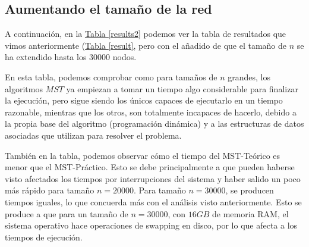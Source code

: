 \documentclass[paper=a4, fontsize=11pt]{article} %
\numberwithin{equation}{section} %
\numberwithin{figure}{section} %
\numberwithin{table}{section} %
\begin{document}
\subsection{Aumentando el tamaño de la red}

A continuación, en la \hyperref[results2]{Tabla \ref*{results2}} podemos ver la tabla de resultados que vimos anteriormente (\hyperref[result]{Tabla \ref*{result}}, pero con el añadido de que el tamaño de $n$ se ha extendido hasta los 30000 nodos.


\label{results2}

En esta tabla, podemos comprobar como para tamaños de $n$ grandes, los algoritmos $MST$ ya empiezan a tomar un tiempo algo considerable para finalizar la ejecución, pero sigue siendo los únicos capaces de ejecutarlo en un tiempo razonable, mientras que los otros, son totalmente incapaces de hacerlo, debido a la propia base del algoritmo (programación dinámica) y a las estructuras de datos asociadas que utilizan para resolver el problema.

También en la tabla, podemos observar cómo el tiempo del MST-Teórico es menor que el MST-Práctico. Esto se debe principalmente a que pueden haberse visto afectados los tiempos por interrupciones del sistema y haber salido un poco más rápido para tamaño $n=20000$. Para tamaño $n=30000$, se producen tiempos iguales, lo que concuerda más con el análisis visto anteriormente. Esto se produce a que para un tamaño de $n=30000$, con $16GB$ de memoria RAM, el sistema operativo hace operaciones de swapping en disco, por lo que afecta a los tiempos de ejecución.

\end{document}
